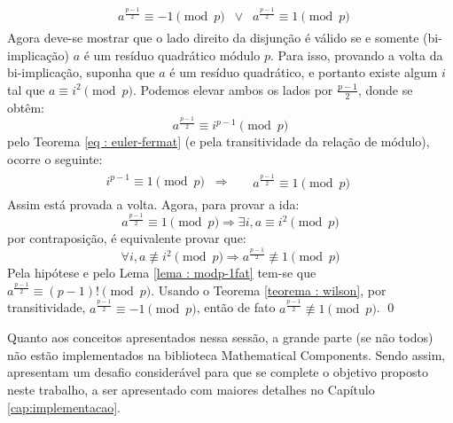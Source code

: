 \begin{enumerate}
\begin{align*}
\begin{aligned}
            \;\; a^{\frac{p-1}{2}} \equiv -1 \pmod p \;\; \lor \;\; a^{\frac{p-1}{2}} \equiv 1 \pmod p
        \end{aligned}
\end{align*}
Agora deve-se mostrar que o lado direito da disjunção é válido se e somente (bi-implicação) $a$ é um resíduo quadrático módulo $p$. Para isso, provando a volta da bi-implicação, suponha que $a$ é um resíduo quadrático, e portanto existe algum $i$ tal que
$a \equiv i^2 \pmod p$. Podemos elevar ambos os lados por $\frac{p-1}{2}$, donde se obtêm:
\begin{equation*}
    a^{\frac{p-1}{2}} \equiv i^{p-1} \pmod p
\end{equation*}
pelo Teorema \ref{eq : euler-fermat} (e pela transitividade da relação de módulo), ocorre o seguinte:
\begin{align*}
    i^{p-1} \equiv 1 \pmod p \;\; \Longrightarrow
    &\begin{aligned}
        \;\; a^{\frac{p-1}{2}} \equiv 1 \pmod p
    \end{aligned}
\end{align*}
Assim está provada a volta. Agora, para provar a ida:
\begin{equation*}
    a^{\frac{p-1}{2}} \equiv 1 \pmod p \Longrightarrow \exists i, a \equiv i^2 \pmod p 
\end{equation*}
por contraposição, é equivalente provar que:
\begin{equation} \label{eq : contrapos}
    \forall i, a \not\equiv i^2  \pmod p \Longrightarrow a^{\frac{p-1}{2}} \not\equiv 1 \pmod p
\end{equation}
Pela hipótese e pelo Lema \ref{lema : modp-1fat} tem-se que $a^{\frac{p-1}{2}} \equiv (p-1)! \pmod{p}$. Usando o Teorema \ref{teorema : wilson}, por transitividade, $a^{\frac{p-1}{2}} \equiv -1 \pmod{p}$, então de fato $a^{\frac{p-1}{2}} \not\equiv 1 \pmod{p}$. \qed

\end{enumerate}

Quanto aos conceitos apresentados nessa sessão, a grande parte (se não todos) não estão implementados na biblioteca Mathematical Components. Sendo assim, apresentam um desafio considerável para que se complete o objetivo proposto neste trabalho, a ser apresentado com maiores detalhes no Capítulo \ref{cap:implementacao}.